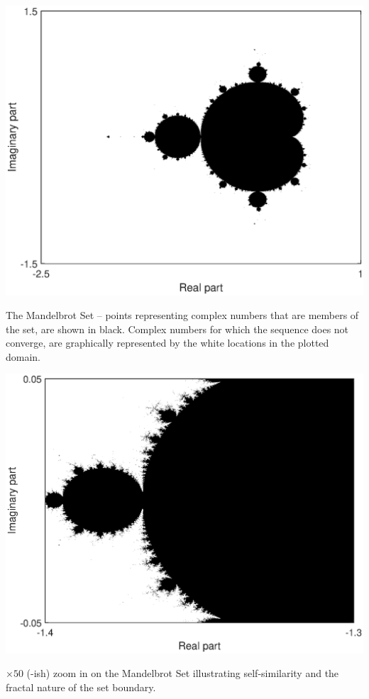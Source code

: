 \documentclass{tufte-book} %
\begin{document}
\begin{marginfigure}[-0.0in]
\includegraphics[width=\linewidth]{ch4-brot1.eps}
\caption{The Mandelbrot Set -- points representing complex numbers that are members of the set, are shown in black. Complex numbers for which the sequence does not converge, are graphically represented by the white locations in the plotted domain.}
\label{fig:ch4-brot1}
\end{marginfigure}

\begin{marginfigure}[0.0in]
\includegraphics[width=\linewidth]{ch4-brot2.eps}
\caption{\(\times50\) (-ish) zoom in on the Mandelbrot Set illustrating self-similarity and the fractal nature of the set boundary.}
\label{fig:ch4-brot2}
\end{marginfigure}
\end{document}
